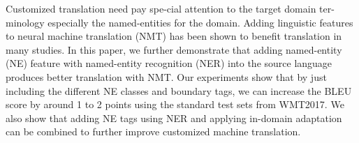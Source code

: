 Customized translation need pay spe-cial attention to the target domain ter-minology especially the named-entities for the domain. Adding linguistic features to neural machine translation (NMT) has been shown to benefit translation in many studies. In this paper, we further demonstrate that adding named-entity (NE) feature with named-entity recognition (NER) into the source language produces better translation with NMT. Our experiments show that by just including the different NE classes and boundary tags, we can increase the BLEU score by around 1 to 2 points using the standard test sets from WMT2017. We also show that adding NE tags using NER and applying in-domain adaptation can be combined to further improve customized machine translation.

